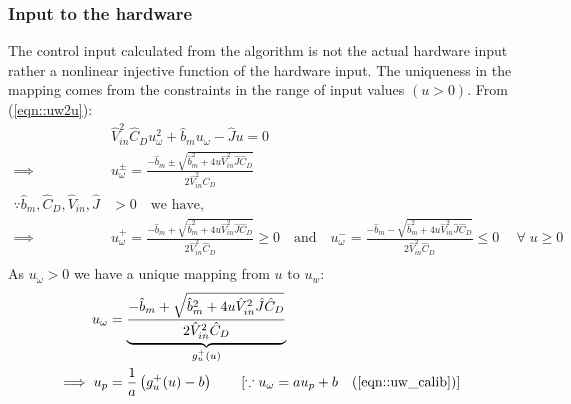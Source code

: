 \subsubsection{Input to the hardware}
The control input calculated from the algorithm is not the actual hardware
input rather a nonlinear injective function of the hardware input. The
uniqueness in the mapping comes from the constraints in the range of input
values $(u > 0)$. From (\ref{eqn::uw2u}):
\begin{align*}
    &\hat V_{in}^2 \hat C_D u_{\omega}^2 + \hat b_m u_\omega - \hat J u = 0\\
    \implies& u^{\pm}_\omega = \frac{-\hat b_m \pm \sqrt{\hat b_m ^2 + 4u \hat V_{in}^2 \hat J \hat C_D}}{2 \hat V_{in}^2 C_D}\\
    \because \hat b_m, \hat C_D, \hat V_{in}, \hat J &> 0 \quad \text{we have, }\qquad \\
    \implies& u^{+}_\omega = \frac{-\hat b_m + \sqrt{\hat b_m ^2 + 4u \hat V_{in}^2 \hat J \hat C_D}}{2 \hat V_{in}^2 \hat C_D} \geq 0 \quad \text{and} \quad
    u^{-}_\omega = \frac{-\hat b_m - \sqrt{\hat b_m ^2 + 4u \hat V_{in}^2 \hat J  \hat C_D}}{2 \hat V_{in}^2 \hat C_D} \leq 0 \quad \
    \forall \; u \geq 0 \\
\end{align*}
As $u_\omega > 0$ we have a unique mapping from $u$ to $u_w$:
\begin{align}
    u_\omega &= \underbrace{\frac{-\hat b_m + \sqrt{\hat b_m ^2 + 4u \hat V_{in}^2 \hat J \hat C_D}}{2 \hat V_{in}^2 \hat C_D}}_{g_u^+(u)}
    \label{eqn::u2uw}\\
    \implies u_p &= \frac{1}{a} \left( g_u^+(u) - b \right) \qquad [\because u_\omega = a u_p + b \quad (\ref{eqn::uw_calib})]
\end{align}
